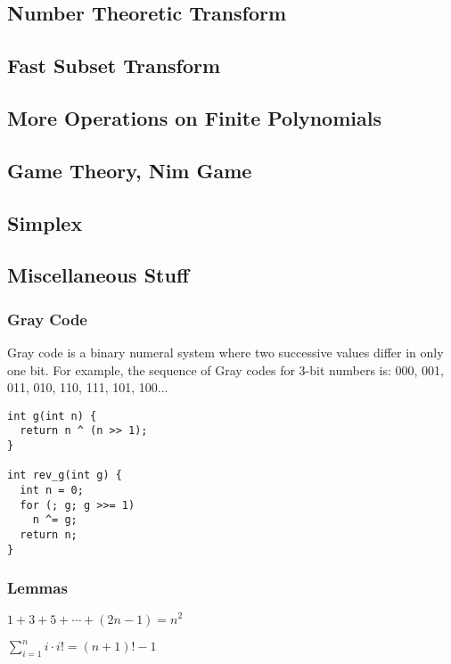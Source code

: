 \subsection{Number Theoretic Transform}
\subsection{Fast Subset Transform}
\subsection{More Operations on Finite Polynomials}
\subsection{Game Theory, Nim Game}
\subsection{Simplex}

\newpage

\subsection{Miscellaneous Stuff}

\subsubsection{Gray Code}

Gray code is a binary numeral system where two successive values differ in only one bit. \cite{GrayCode_CPAlgo}
For example, the sequence of Gray codes for 3-bit numbers is: 000, 001, 011, 010, 110, 111, 101, 100...

\begin{lstlisting}
int g(int n) {
  return n ^ (n >> 1);
}

int rev_g(int g) {
  int n = 0;
  for (; g; g >>= 1)
    n ^= g;
  return n;
}
\end{lstlisting}

\subsubsection{Lemmas}

\begin{lemma}
$1 + 3 + 5 + \cdots + (2n - 1) = n^2$
\end{lemma}

\begin{lemma}
$\displaystyle \sum_{i=1}^{n} i \cdot i! = (n + 1)! - 1$
\end{lemma}

